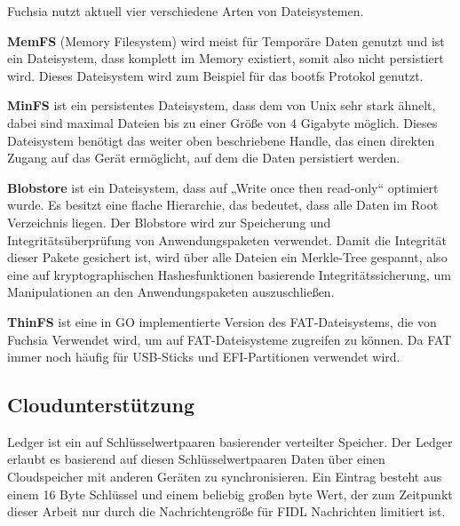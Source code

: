 \documentclass[a4paper]{scrartcl}
\begin{document}
Fuchsia nutzt aktuell vier verschiedene Arten von Dateisystemen.

\textbf{MemFS} (Memory Filesystem) wird meist für Temporäre Daten genutzt und ist ein Dateisystem, dass komplett im Memory existiert, somit also nicht persistiert wird. Dieses Dateisystem wird zum Beispiel für das bootfs Protokol genutzt.

\textbf{MinFS} ist ein persistentes Dateisystem, dass dem von Unix sehr stark ähnelt, dabei sind maximal Dateien bis zu einer Größe von 4 Gigabyte möglich. Dieses Dateisystem benötigt das weiter oben beschriebene Handle, das einen direkten Zugang auf das Gerät ermöglicht, auf dem die Daten persistiert werden.

\textbf{Blobstore} ist ein Dateisystem, dass auf „Write once then read-only“ optimiert wurde. Es besitzt eine flache Hierarchie, das bedeutet, dass alle Daten im Root Verzeichnis liegen. Der Blobstore wird zur Speicherung und Integritätsüberprüfung von Anwendungspaketen verwendet. Damit die Integrität dieser Pakete gesichert ist, wird über alle Dateien ein Merkle-Tree gespannt, also eine auf kryptographischen Hashesfunktionen basierende Integritätssicherung, um Manipulationen an den Anwendungspaketen auszuschließen.

\textbf{ThinFS} ist eine in GO implementierte Version des FAT-Dateisystems, die von Fuchsia Verwendet wird, um auf FAT-Dateisysteme zugreifen zu können. Da FAT immer noch häufig für USB-Sticks und EFI-Partitionen verwendet wird.
\subsection{Cloudunterstützung}
\label{sec:Ledger}
Ledger ist ein auf Schlüsselwertpaaren basierender verteilter Speicher. Der Ledger erlaubt es basierend auf diesen Schlüsselwertpaaren Daten über einen Cloudspeicher mit anderen Geräten zu synchronisieren. Ein Eintrag besteht aus einem 16 Byte Schlüssel und einem beliebig großen byte Wert, der zum Zeitpunkt dieser Arbeit nur durch die Nachrichtengröße für FIDL Nachrichten limitiert ist.
\end{document}
